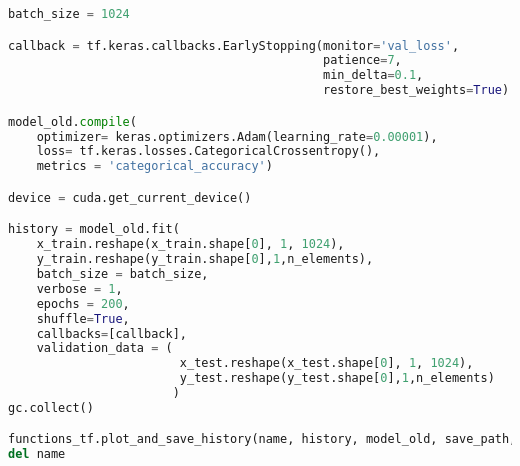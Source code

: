 \begin{lstlisting}[language=Python]
batch_size = 1024

callback = tf.keras.callbacks.EarlyStopping(monitor='val_loss', 
                                            patience=7, 
                                            min_delta=0.1,
                                            restore_best_weights=True)

model_old.compile(
    optimizer= keras.optimizers.Adam(learning_rate=0.00001),
    loss= tf.keras.losses.CategoricalCrossentropy(),
    metrics = 'categorical_accuracy')

device = cuda.get_current_device()

history = model_old.fit(
    x_train.reshape(x_train.shape[0], 1, 1024),
    y_train.reshape(y_train.shape[0],1,n_elements),
    batch_size = batch_size,
    verbose = 1,
    epochs = 200,
    shuffle=True,
    callbacks=[callback],
    validation_data = (
                        x_test.reshape(x_test.shape[0], 1, 1024),
                        y_test.reshape(y_test.shape[0],1,n_elements)
                       )
gc.collect()

functions_tf.plot_and_save_history(name, history, model_old, save_path, subfolder=subfolder)
del name
\end{lstlisting}

